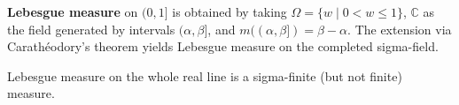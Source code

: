 \textbf{Lebesgue measure} on $(0,1]$ is obtained by taking $\Omega = \{w \mid 0 < w \leq 1\}$, $\mathbb{C}$ as the field generated by intervals $(\alpha, \beta]$, and $m((\alpha, \beta]) = \beta - \alpha$. The extension via Carathéodory's theorem yields Lebesgue measure on the completed sigma-field.

Lebesgue measure on the whole real line is a sigma-finite (but not finite) measure.
